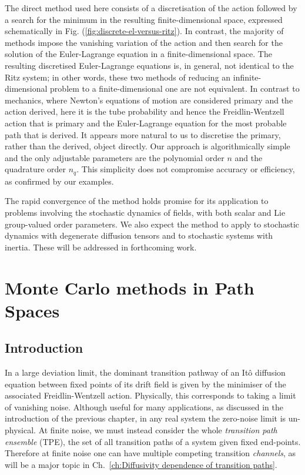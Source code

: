 The direct method used here consists of a discretisation of the action
followed by a search for the minimum in the resulting finite-dimensional
space, expressed schematically in Fig. (\ref{fig:discrete-el-versus-ritz}).
In contrast, the majority of methods impose the vanishing variation
of the action and then search for the solution of the Euler-Lagrange
equation in a finite-dimensional space. The resulting discretised
Euler-Lagrange equations is, in general, not identical to the Ritz
system; in other words, these two methods of reducing an infinite-dimensional
problem to a finite-dimensional one are not equivalent. In contrast
to mechanics, where Newton's equations of motion are considered primary
and the action derived, here it is the tube probability and hence
the Freidlin-Wentzell action that is primary and the Euler-Lagrange
equation for the most probable path that is derived. It appears more
natural to us to discretise the primary, rather than the derived,
object directly. Our approach is algorithmically simple and the only
adjustable parameters are the polynomial order $n$ and the quadrature
order $n_{q}.$ This simplicity does not compromise accuracy or efficiency,
as confirmed by our examples. 

The rapid convergence of the method holds promise for its application
to problems involving the stochastic dynamics of fields, with both
scalar and Lie group-valued order parameters. We also expect the method
to apply to stochastic dynamics with degenerate diffusion tensors
and to stochastic systems with inertia. These will be addressed in
forthcoming work.

\chapter{Monte Carlo methods in Path Spaces}

\section{Introduction}

In a large deviation limit, the dominant transition pathway of an Itô diffusion equation between fixed points of its drift field is given by the minimiser of the associated Freidlin-Wentzell action. Physically, this corresponds to taking a limit of vanishing noise. Although useful for many applications, as discussed in the introduction of the previous chapter, in any real system the zero-noise limit is un-physical. At finite noise, we must instead consider the whole \textit{transition path ensemble} (TPE), the set of all transition paths of a system given fixed end-points. Therefore at finite noise one can have multiple competing transition \textit{channels}, as will be a major topic in Ch.~\ref{ch:Diffusivity dependence of transition paths}.


